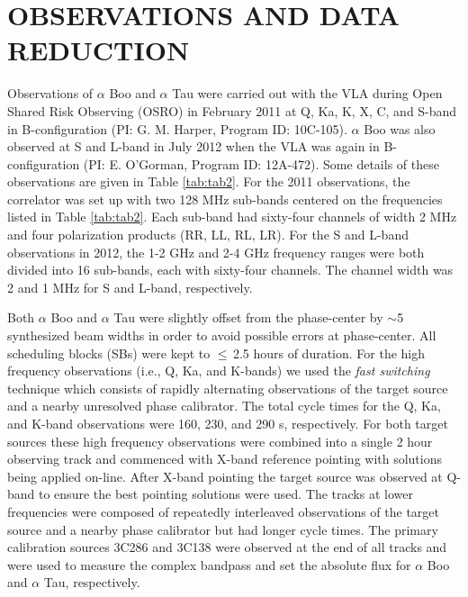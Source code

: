 \documentclass[iop]{emulateapj}
\begin{document}
\section{OBSERVATIONS AND DATA REDUCTION}

Observations of $\alpha$ Boo and $\alpha$ Tau were carried out with the VLA during Open Shared Risk Observing (OSRO) in February 2011 at Q, Ka, K, X, C, and S-band in B-configuration (PI: G. M. Harper, Program ID: 10C-105). $\alpha$ Boo was also observed at S and L-band in July 2012 when the VLA was again in B-configuration (PI: E. O'Gorman, Program ID: 12A-472). Some details of these observations are given in Table \ref{tab:tab2}. For the 2011 observations, the correlator was set up with two 128 MHz sub-bands centered on the frequencies listed in Table \ref{tab:tab2}. Each sub-band had sixty-four channels of width 2 MHz and four polarization products (RR, LL, RL, LR). For the S and L-band observations in 2012, the 1-2 GHz and 2-4 GHz frequency ranges were both divided into 16 sub-bands, each with sixty-four channels. The channel width was 2 and 1 MHz for S and L-band, respectively.

Both $\alpha$ Boo and $\alpha$ Tau were slightly offset from the phase-center by $\sim$5 synthesized beam widths in order to avoid possible errors at phase-center. All scheduling blocks (SBs) were kept to $\le$\,2.5 hours of duration. For the high frequency observations (i.e., Q, Ka, and K-bands) we used the \textit{fast switching} technique which consists of rapidly alternating observations of the target source and a nearby unresolved phase calibrator. The total cycle times for the Q, Ka, and K-band observations were 160, 230, and 290 s, respectively. For both target sources these high frequency observations were combined into a single 2 hour observing track and commenced with X-band reference pointing with solutions being applied on-line. After X-band pointing the target source was observed at Q-band to ensure the best pointing solutions were used. The tracks at lower frequencies were composed of repeatedly interleaved observations of the target source and a nearby phase calibrator but had longer cycle times. The primary calibration sources 3C286 and 3C138 were observed at the end of all tracks and were used to measure the complex bandpass and set the absolute flux for $\alpha$ Boo and $\alpha$ Tau, respectively.  
\end{document}
